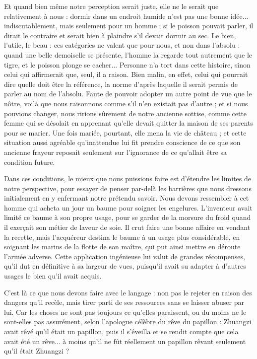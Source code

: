 Et quand bien même notre perception serait juste, elle ne le serait que relativement à
nous : dormir dans un endroit humide n'est pas une bonne idée...
indiscutablement, mais
seulement pour un homme ; si le poisson pouvait parler, il dirait le contraire et serait bien
à plaindre s'il devait dormir au sec.
Le bien, l'utile, le beau : ces catégories ne valent que
pour nous, et non dans l'absolu : quand une belle demoiselle se présente, l'homme la regarde tout autrement que le tigre, et le poisson plonge se cacher...
Personne n'a tort dans
cette histoire, sinon celui qui affirmerait que, seul, il a raison.
Bien malin, en effet, celui
qui pourrait dire quelle doit être la référence, la norme d'après laquelle il serait permis de
parler au nom de l'absolu.
Faute de pouvoir adopter un autre point de vue que le nôtre,
voilà que nous raisonnons comme s'il n'en existait pas d'autre ; et si nous pouvions changer, nous ririons sûrement de notre ancienne sottise, comme cette femme qui se désolait
en apprenant qu'elle devait quitter la maison de ses parents pour se marier.
Une fois mariée, pourtant, elle mena la vie de château ; et cette situation aussi agréable qu'inattendue
lui fit prendre conscience de ce que son ancienne frayeur reposait seulement sur
l'ignorance de ce qu'allait être sa condition future.

Dans ces conditions, le mieux que nous puissions faire est d'étendre les limites de notre
perspective, pour essayer de penser par-delà les barrières que nous dressons initialement
en y enfermant notre prétendu savoir.
Nous devons ressembler à cet homme qui acheta un
jour un baume pour soigner les engelures.
L'inventeur avait limité ce baume à son propre
usage, pour se garder de la morsure du froid quand il exerçait son métier de laveur de
soie.
Il crut faire une bonne affaire en vendant la recette, mais l'acquéreur destina le
baume à un usage plus considérable, en soignant les marins de la flotte de son maître, qui
put ainsi mettre en déroute l'armée adverse.
Cette application ingénieuse lui valut de
grandes récompenses, qu'il dut en définitive à sa largeur de vues, puisqu'il avait su adapter à d'autres usages le bien qu'il avait acquis.

C'est là ce que nous devons faire avec le langage : non pas le rejeter en raison des dangers
qu'il recèle, mais tirer parti de ses ressources sans se laisser abuser par lui.
Car les choses ne sont pas toujours ce qu'elles paraissent, ou du moins ne le sont-elles pas assurément,
selon l'apologue célèbre du rêve du papillon : Zhuangzi avait rêvé qu'il était un papillon,
puis il s'éveilla et se rendit compte que cela avait été un rêve...
à moins qu'il ne fût réellement un papillon rêvant seulement qu'il était Zhuangzi ?

